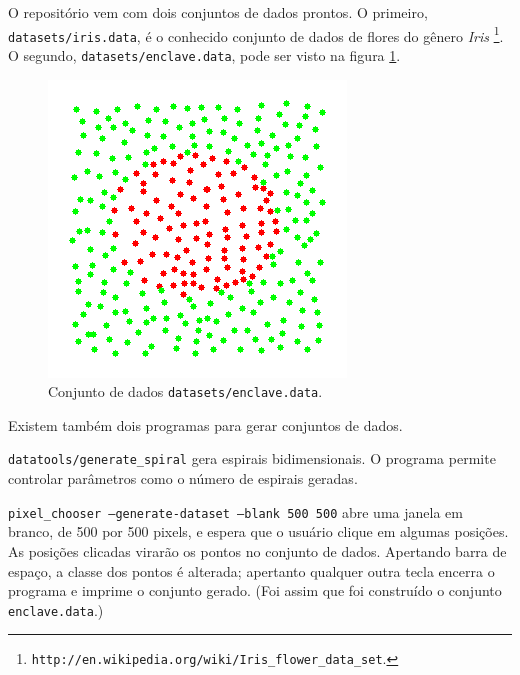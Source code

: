 \documentclass{article}
\begin{document}
O repositório vem com dois conjuntos de dados prontos.
O primeiro, \verb|datasets/iris.data|,
é o conhecido conjunto de dados de flores do gênero \emph{Iris}%
\footnote{
    \texttt{http://en.wikipedia.org/wiki/Iris\_flower\_data\_set}.
}.
O segundo, \verb|datasets/enclave.data|,
pode ser visto na figura \ref{enclave}.

\begin{figure}[h]
    \centering
    \includegraphics[scale=0.5]{enclave.png}
    \caption{Conjunto de dados \texttt{datasets/enclave.data}.}
    \label{enclave}
\end{figure}

Existem também dois programas para gerar conjuntos de dados.

\texttt{datatools/generate\_spiral} gera espirais bidimensionais.
O programa permite controlar parâmetros como o número de espirais geradas.

\texttt{pixel\_chooser --generate-dataset --blank 500 500} abre uma janela em branco,
de 500 por 500 pixels, e espera que o usuário clique em algumas posições.
As posições clicadas virarão os pontos no conjunto de dados.
Apertando barra de espaço, a classe dos pontos é alterada;
apertanto qualquer outra tecla encerra o programa e imprime o conjunto gerado.
(Foi assim que foi construído o conjunto \texttt{enclave.data}.)
\end{document}
